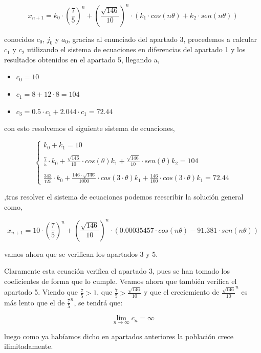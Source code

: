 \documentclass{article}
\begin{document}
\begin{equation*}
x_{n+1} = k_0\cdot(\frac{7}{5})^n + (\frac{\sqrt{146}}{10})^n\cdot(k_1\cdot cos(n\theta) + k_2\cdot sen(n\theta))
\end{equation*}

conocidos $c_0$, $j_0$ y $a_0$, gracias al enunciado del apartado 3, procedemos a calcular $c_1$ y $c_2$ utilizando el sistema de ecuaciones en diferencias del apartado 1 y los resultados obtenidos en el apartado 5, llegando a,

\begin{itemize}
\item $c_0 = 10$
\item $c_1 = 8 + 12\cdot8=104$
\item $c_3 = 0.5\cdot c_1 + 2.044\cdot c_1 = 72.44$
\end{itemize}

con esto resolvemos el siguiente sistema de ecuaciones,

\begin{equation*}
\left\{ \begin{array}{lcc}
             k_0 + k_1 = 10 \\
             \\ \frac{7}{5}\cdot k_0 + \frac{\sqrt{146}}{10}\cdot cos(\theta) k_1 + \frac{\sqrt{146}}{10}\cdot sen(\theta) k_2 = 104 \\
             \\ \frac{343}{125} \cdot k_0 + \frac{146\cdot\sqrt{146}}{1000}\cdot cos(3\cdot \theta) k_1 + \frac{146}{100}\cdot cos(3\cdot \theta) k_1 = 72.44
             \end{array}
   \right.
\end{equation*}

,tras resolver el sistema de ecuaciones podemos reescribir la solución general como,

\begin{equation*}
x_{n+1} = 10\cdot(\frac{7}{5})^n + (\frac{\sqrt{146}}{10})^n\cdot(0.00035457 \cdot cos(n\theta) -91.381\cdot sen(n\theta))
\end{equation*}

vamos ahora que se verifican los apartados 3 y 5.

Claramente esta ecuación verifica el apartado 3, pues se han tomado los coeficientes de forma que lo cumple. Veamos ahora que también verifica el apartado 5. Viendo que $\frac{7}{5} > 1$, que $\frac{7}{5} > \frac{\sqrt{146}}{10}$ y que el creciemiento de $\frac{\sqrt{146}}{10}^n$ es más lento que el de $\frac{7}{5}^n$, se tendrá que:

\begin{equation*}
\lim_{n \to \infty} c_n = \infty
\end{equation*}

luego como ya habíamos dicho en apartados anteriores la población crece ilimitadamente.
\end{document}
